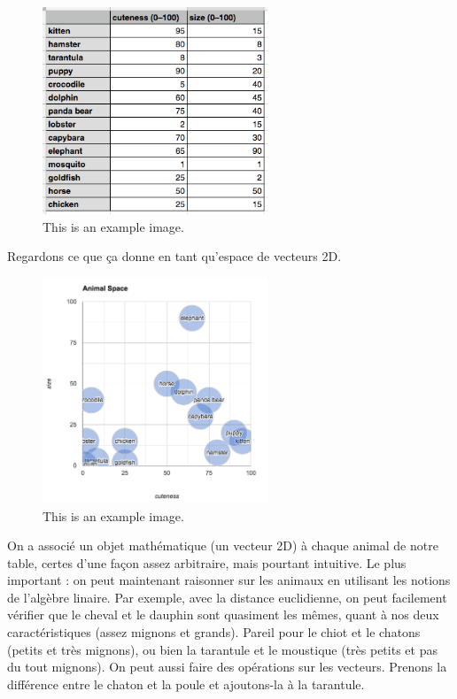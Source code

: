 \documentclass[11pt, a4paper]{report}
\begin{document}
\begin{figure}[h]
  \centering
  \includegraphics[width=0.6\textwidth]{animal-table.png}
  \caption{This is an example image.}
  \label{fig:example}
\end{figure}

Regardons ce que ça donne en tant qu'espace de vecteurs 2D. 

\begin{figure}[h]
  \centering
  \includegraphics[width=0.6\textwidth]{animal-space.png}
  \caption{This is an example image.}
  \label{fig:example}
\end{figure}

On a associé un objet mathématique (un vecteur 2D) à chaque animal de notre table, certes d'une façon
assez arbitraire, mais pourtant intuitive. Le plus important : on peut maintenant raisonner sur les animaux en 
utilisant les notions de l'algèbre linaire. Par exemple, avec la distance euclidienne, on peut facilement 
vérifier que le cheval et le dauphin sont quasiment les mêmes, quant à nos deux caractéristiques 
(assez mignons et grands). Pareil pour le chiot et le chatons (petits et très mignons), ou bien la 
tarantule et le moustique (très petits et pas du tout mignons). On peut aussi faire des opérations sur 
les vecteurs. Prenons la différence entre le chaton et la poule et ajoutons-la à la tarantule. 
\end{document}
